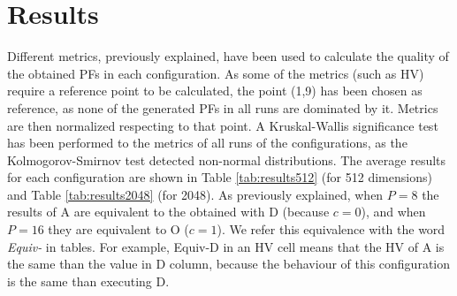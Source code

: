 \documentclass[preprint]{elsarticle}
\begin{document}
\section{Results}
\label{sec:results}


Different metrics, previously explained, have been used
to calculate the quality of the obtained PFs in each configuration. As
some of the metrics  (such as HV) require a reference point to be
calculated, the point (1,9) has been chosen as reference, as none of
the generated PFs in all runs are dominated by it. Metrics are then
normalized respecting to that point. A Kruskal-Wallis significance
test has been performed to the metrics of all runs of the
configurations, as the Kolmogorov-Smirnov test detected non-normal
distributions. The average results for each configuration are shown in
Table \ref{tab:results512} (for 512 dimensions) and Table
\ref{tab:results2048} (for 2048). As previously explained, when $P=8$
the results of A are equivalent to the obtained with D (because
$c=0$), and when $P=16$ they are equivalent to O ($c=1$). We refer this equivalence with the word {\em Equiv-} in tables. For example, Equiv-D in an HV cell  means that the HV of A is the same than the value in D column, because the behaviour of this configuration is the same than executing D.
\end{document}
